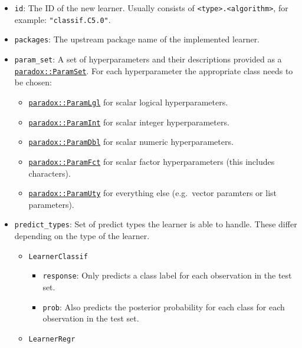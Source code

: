 \documentclass[]{scrbook}
\providecommand{\tightlist}{%
  \setlength{\itemsep}{0pt}\setlength{\parskip}{0pt}}
\begin{document}
\begin{itemize}
\tightlist
\item
  \texttt{id}: The ID of the new learner. Usually consists of \texttt{\textless{}type\textgreater{}.\textless{}algorithm\textgreater{}}, for example: \texttt{"classif.C5.0"}.
\item
  \texttt{packages}: The upstream package name of the implemented learner.
\item
  \texttt{param\_set}: A set of hyperparameters and their descriptions provided as a \href{https://paradox.mlr-org.com/reference/ParamSet.html}{\texttt{paradox::ParamSet}}.
  For each hyperparameter the appropriate class needs to be chosen:

  \begin{itemize}
  \tightlist
  \item
    \href{https://paradox.mlr-org.com/reference/ParamLgl.html}{\texttt{paradox::ParamLgl}} for scalar logical hyperparameters.
  \item
    \href{https://paradox.mlr-org.com/reference/ParamInt.html}{\texttt{paradox::ParamInt}} for scalar integer hyperparameters.
  \item
    \href{https://paradox.mlr-org.com/reference/ParamDbl.html}{\texttt{paradox::ParamDbl}} for scalar numeric hyperparameters.
  \item
    \href{https://paradox.mlr-org.com/reference/ParamFct.html}{\texttt{paradox::ParamFct}} for scalar factor hyperparameters (this includes characters).
  \item
    \href{https://paradox.mlr-org.com/reference/ParamUty.html}{\texttt{paradox::ParamUty}} for everything else (e.g.~vector paramters or list parameters).
  \end{itemize}
\item
  \texttt{predict\_types}: Set of predict types the learner is able to handle.
  These differ depending on the type of the learner.

  \begin{itemize}
  \tightlist
  \item
    \texttt{LearnerClassif}

    \begin{itemize}
    \tightlist
    \item
      \texttt{response}: Only predicts a class label for each observation in the test set.
    \item
      \texttt{prob}: Also predicts the posterior probability for each class for each observation in the test set.
    \end{itemize}
  \item
    \texttt{LearnerRegr}


\end{itemize}
\end{itemize}
\end{document}
